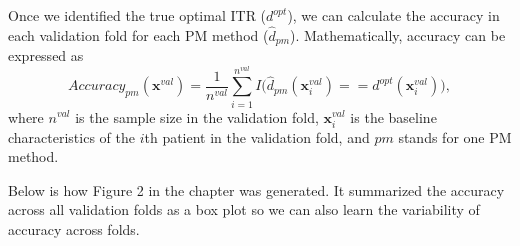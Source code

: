 \documentclass[
  letterpaper,
  DIV=11,
  numbers=noendperiod]{scrreprt}
\newenvironment{Shaded}{\begin{snugshade}}{\end{snugshade}}
\newcommand{\CommentTok}[1]{\textcolor[rgb]{0.37,0.37,0.37}{#1}}
\newcommand{\ConstantTok}[1]{\textcolor[rgb]{0.56,0.35,0.01}{#1}}
\newcommand{\ControlFlowTok}[1]{\textcolor[rgb]{0.00,0.23,0.31}{#1}}
\newcommand{\DecValTok}[1]{\textcolor[rgb]{0.68,0.00,0.00}{#1}}
\newcommand{\FunctionTok}[1]{\textcolor[rgb]{0.28,0.35,0.67}{#1}}
\newcommand{\NormalTok}[1]{\textcolor[rgb]{0.00,0.23,0.31}{#1}}
\newcommand{\OtherTok}[1]{\textcolor[rgb]{0.00,0.23,0.31}{#1}}
\newcommand{\SpecialCharTok}[1]{\textcolor[rgb]{0.37,0.37,0.37}{#1}}
\newcommand{\StringTok}[1]{\textcolor[rgb]{0.13,0.47,0.30}{#1}}
\begin{document}
\begin{Shaded}
\end{Shaded}

Once we identified the true optimal ITR (\(d^{opt}\)), we can calculate
the accuracy in each validation fold for each PM method
(\(\hat{d}_{pm}\)). Mathematically, accuracy can be expressed as
\[Accuracy_{pm}(\boldsymbol{x}^{val}) = \frac{1}{n^{val}}\sum_{i = 1}^{n^{val}} I\big(\hat{d}_{pm}(\boldsymbol{x}_i^{val}) == d^{opt}(\boldsymbol{x}_i^{val})\big),\]
where \(n^{val}\) is the sample size in the validation fold,
\(\boldsymbol{x}_i^{val}\) is the baseline characteristics of the
\(i\)th patient in the validation fold, and \(pm\) stands for one PM
method.

Below is how Figure 2 in the chapter was generated. It summarized the
accuracy across all validation folds as a box plot so we can also learn
the variability of accuracy across folds.
\end{document}
